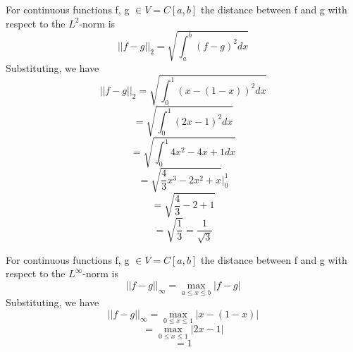 \documentclass[12pt]{article}
\begin{document}
\begin{enumerate}[leftmargin=2em]
\begin{enumerate}[leftmargin=!]
        For continuous functions f, g $\in V=C[a,b]$ the distance between f and g with respect to the $L^2$-norm is
        \[||f-g||_{2}=\sqrt{\int_{a}^{b}(f-g)^{2}dx}\]
        Substituting, we have
        \[||f-g||_{2}=\sqrt{\int_{0}^{1}(x-(1-x))^{2}dx}\]
        \[=\sqrt{\int_{0}^{1}(2x-1)^{2}dx}\]
        \[=\sqrt{\int_{0}^{1}4x^{2}-4x+1dx}\]
        \[=\sqrt{{\frac{4}{3}x^{3}-2x^{2}+x}}\rvert_{0}^{1}\]
        \[=\sqrt{\frac{4}{3}-2+1}\]
        \[=\sqrt{\frac{1}{3}}=\frac{1}{\sqrt{3}}\]

        For continuous functions f, g $\in V=C[a,b]$ the distance between f and g with respect to the $L^{\infty}$-norm is
        \[||f-g||_{\infty}=\max_{a \leq x \leq b}{|f-g|}\]
        Substituting, we have
        \[||f-g||_{\infty}=\max_{0 \leq x \leq 1}{|x-(1-x)|}\]
        \[=\max_{0 \leq x \leq 1}{|2x-1|}\]
        \[=1\]

    \end{enumerate}
    
\end{enumerate}
\end{document}
